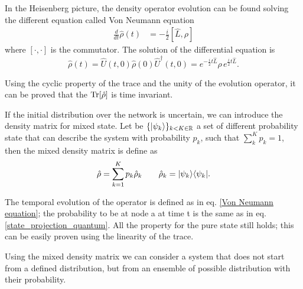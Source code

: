 In the Heisenberg picture, the density operator evolution can be found solving the different equation called Von Neumann equation
\begin{equation}\label{Von Neumann equation}
    \begin{split}
        \frac{d}{dt}\hat\rho(t) 
        &= -\frac{i}{2}\left[\hat L,\rho\right]
    \end{split}
\end{equation}
where $[\cdot,\cdot]$ is the commutator.
The solution of the differential equation is
\begin{equation}
    \hat\rho(t) = \hat U(t,0)\hat\rho(0)\hat U^\dagger(t,0) = e^{-\frac{i}{2}t\hat L}\hat\rho\, e^{\frac{i}{2}t\hat L}.
\end{equation}

Using the cyclic property of the trace and the unity of the evolution operator, it can be proved that the $\operatorname{Tr}[\hat\rho]$ is time invariant.

If the initial distribution over the network is uncertain, we can introduce the density matrix for mixed state. Let be $\{\lvert\psi_k\rangle\}_{k<K\in\mathbb{R}}$ a set of different probability state that can describe the system with probability $p_k$, such that $\sum_k^K p_k = 1$, then the mixed density matrix is define as
\begin{equation}
    \hat \rho = \sum_{k=1}^K p_k \hat \rho_k \qquad \hat\rho_k = \lvert\psi_k\rangle\langle\psi_k\rvert.
\end{equation}

The temporal evolution of the operator is defined as in eq. \eqref{Von Neumann equation}; the probability to be at node a at time t is the same as in eq. \eqref{state_projection_quantum}. All the property for the pure state still holds; this can be easily proven using the linearity of the trace.

Using the mixed density matrix we can consider a system that does not start from a defined distribution, but from an ensemble of possible distribution with their probability. 

